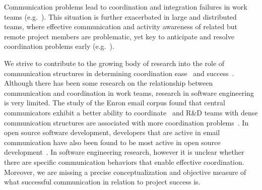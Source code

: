 \documentclass[12pt,oneside]{book}
\newcommand{\cu}{collaborative task}
\newcommand{\people}{project member}
\begin{document}






Communication problems lead to coordination and integration failures in work
teams (e.g.~\cite{Grinter:1999geography,Herbsleb:1999ew,souza:cscw:2004}). This
situation is further exacerbated in large and distributed teams, where effective
communication and activity awareness of related but remote project members are
problematic, yet key to anticipate and resolve coordination problems early
(e.g.~\cite{Grinter:1999geography,Herbsleb:1999ew}).

We strive to contribute to the growing body of research into the role of
communication structures in determining coordination ease~\cite{hinds:cscw:2006} and
success~\cite{hossain:cscw:2006}. Although there has been some research on the
relationship between communication and coordination in work teams, research in
software engineering is very limited. The study of the Enron email corpus found
that central communicators exhibit a better ability to
coordinate~\cite{hossain:cscw:2006} and R\&D teams with dense communication
structures are associated with more coordination problems~\cite{hinds:cscw:2006}. In
open source software development, developers that are active in email
communication have also been found to be most active in open source
development~\cite{bird:msr:2006}. In software engineering research, however it is
unclear whether there are specific communication behaviors that enable effective
coordination. Moreover, we are missing a precise conceptualization and objective
measure of what successful communication in relation to project success is.
\end{document}
